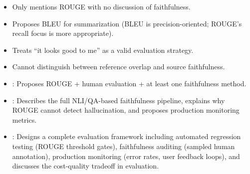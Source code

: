 \begin{interviewq}
\redflags
\begin{itemize}
    \item Only mentions ROUGE with no discussion of faithfulness.
    \item Proposes BLEU for summarization (BLEU is precision-oriented; ROUGE's
          recall focus is more appropriate).
    \item Treats ``it looks good to me'' as a valid evaluation strategy.
    \item Cannot distinguish between reference overlap and source faithfulness.
\end{itemize}


\goodgreat
\begin{itemize}
    \item {}: Proposes ROUGE + human evaluation + at least one
          faithfulness method.
    \item {}: Describes the full NLI/QA-based faithfulness pipeline,
          explains why ROUGE cannot detect hallucination, and proposes production
          monitoring metrics.
    \item {}: Designs a complete evaluation framework including
          automated regression testing (ROUGE threshold gates), faithfulness
          auditing (sampled human annotation), production monitoring (error
          rates, user feedback loops), and discusses the cost-quality tradeoff
          in evaluation.
\end{itemize}

\end{interviewq}

\vspace{0.5em}

